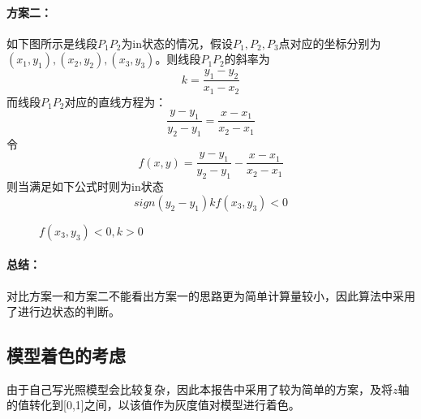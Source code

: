 \documentclass[10pt]{article}
\begin{document}
\paragraph{方案二：}
如下图所示是线段$P_1P_2$为in状态的情况，假设$P_1,P_2,P_3$点对应的坐标分别为$(x_1,y_1),(x_2,y_2),(x_3,y_3)$。则线段$P_1P_2$的斜率为
\begin{equation}
k=\frac{y_1-y_2}{x_1-x_2}
\end{equation}
而线段$P_1P_2$对应的直线方程为：
\begin{equation}
\frac{y-y_1}{y_2-y_1}=\frac{x-x_1}{x_2-x_1}
\end{equation}
令
\begin{equation}
f(x,y)=\frac{y-y_1}{y_2-y_1}-\frac{x-x_1}{x_2-x_1}
\end{equation}
则当满足如下公式时则为in状态
\begin{equation}
sign(y_2-y_1)kf(x_3,y_3)<0
\end{equation}


\begin{figure}[H]
\begin{center}
\begin{minipage}[t]{0.45\linewidth}
\caption{$f(x_3,y_3)>0,k<0$}
\end{minipage}
\begin{minipage}[t]{0.45\linewidth}
\caption{$f(x_3,y_3)<0,k>0$}
\end{minipage}
\end{center}
\end{figure}

\paragraph{总结：}
对比方案一和方案二不能看出方案一的思路更为简单计算量较小，因此算法中采用了进行边状态的判断。
\subsection{模型着色的考虑}
由于自己写光照模型会比较复杂，因此本报告中采用了较为简单的方案，及将$z$轴的值转化到[0,1]之间，以该值作为灰度值对模型进行着色。
\end{document}
